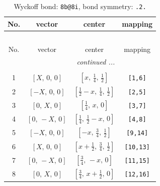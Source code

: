 \documentclass[fleqn,8pt]{jsarticle}
\begin{document}
\begin{longtable}{cccc}
\caption{Wyckoff bond: {\tt 8b@8i}, bond symmetry: {\tt .2.}}
 \\
 \hline \hline
No. & vector & center & mapping \\ \hline \endfirsthead

\multicolumn{3}{l}{\tablename\ \thetable{}} \\
 \hline \hline
No. & vector & center & mapping \\ \hline \endhead

 \hline \hline
\multicolumn{3}{r}{\footnotesize\it continued ...} \\ \endfoot

 \hline \hline
\multicolumn{3}{r}{} \\ \endlastfoot

1 & $\left[ X,\, 0,\, 0 \right]$ & $\left[ x,\, \frac{1}{4},\, \frac{1}{2} \right]$ & {\tt [1,6]} \\ \hline
2 & $\left[ - X,\, 0,\, 0 \right]$ & $\left[ \frac{1}{2} - x,\, \frac{1}{4},\, \frac{1}{2} \right]$ & {\tt [2,5]} \\ \hline
3 & $\left[ 0,\, X,\, 0 \right]$ & $\left[ \frac{1}{4},\, x,\, 0 \right]$ & {\tt [3,7]} \\ \hline
4 & $\left[ 0,\, - X,\, 0 \right]$ & $\left[ \frac{1}{4},\, \frac{1}{2} - x,\, 0 \right]$ & {\tt [4,8]} \\ \hline
5 & $\left[ - X,\, 0,\, 0 \right]$ & $\left[ - x,\, \frac{3}{4},\, \frac{1}{2} \right]$ & {\tt [9,14]} \\ \hline
6 & $\left[ X,\, 0,\, 0 \right]$ & $\left[ x + \frac{1}{2},\, \frac{3}{4},\, \frac{1}{2} \right]$ & {\tt [10,13]} \\ \hline
7 & $\left[ 0,\, - X,\, 0 \right]$ & $\left[ \frac{3}{4},\, - x,\, 0 \right]$ & {\tt [11,15]} \\ \hline
8 & $\left[ 0,\, X,\, 0 \right]$ & $\left[ \frac{3}{4},\, x + \frac{1}{2},\, 0 \right]$ & {\tt [12,16]} \\
\end{longtable}
\renewcommand{\arraystretch}{1.2}
\end{document}
